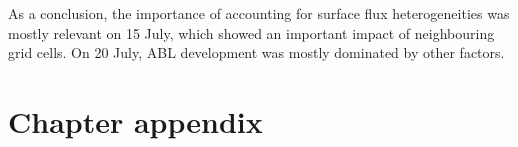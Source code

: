 As a conclusion, the importance of accounting for surface flux heterogeneities was mostly relevant on 15 July, which showed an important impact of neighbouring grid cells. On 20 July, ABL development was mostly dominated by other factors.

\hfill




\clearpage

\section{Chapter appendix}


